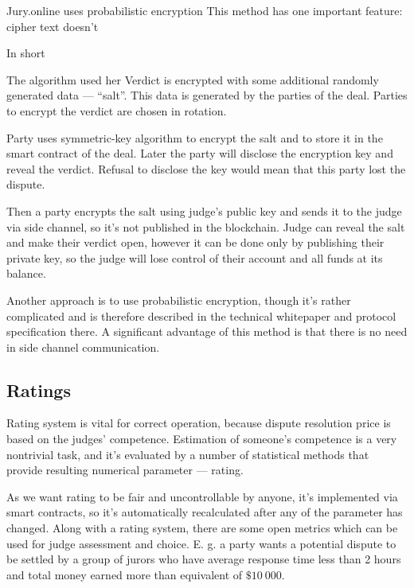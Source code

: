 \documentclass[12pt]{article}
\begin{document}
Jury.online uses probabilistic encryption%
This method has one important feature: cipher text doesn't

In short

The algorithm used her
Verdict is encrypted with some additional randomly generated data — ``salt''. This data is generated by the parties of the deal. Parties to
encrypt the verdict are chosen in rotation.

Party uses symmetric-key algorithm to encrypt the salt and to store it in the smart contract of the deal. Later the party will disclose the
encryption key and reveal the verdict. Refusal to disclose the key would mean that this party lost the dispute.

Then a party encrypts the salt using judge’s public key and sends it to the judge via side channel, so it’s not published in the blockchain.
Judge can reveal the salt and make their verdict open, however it can be done only by publishing their private key, so the judge will lose
control of their account and all funds at its balance.

Another approach is to use probabilistic encryption, though it’s rather complicated and is therefore described in the technical whitepaper
and protocol specification there. A significant advantage of this method is that there is no need in side channel communication.

\subsection{Ratings}
Rating system is vital for correct operation, because dispute resolution price is based on the judges’ competence. Estimation of someone's
competence is a very nontrivial task, and it’s evaluated by a number of statistical methods that provide resulting numerical parameter —
rating. 

As we want rating to be fair and uncontrollable by anyone, it’s implemented via smart contracts, so it’s automatically recalculated after
any of the parameter has changed. Along with a rating system, there are some open metrics which can be used for judge assessment and choice.
E. g. a party wants a potential dispute to be settled by a group of jurors who have average response time less than 2 hours and total money
earned more than equivalent of $\$10\ 000$.
\end{document}
